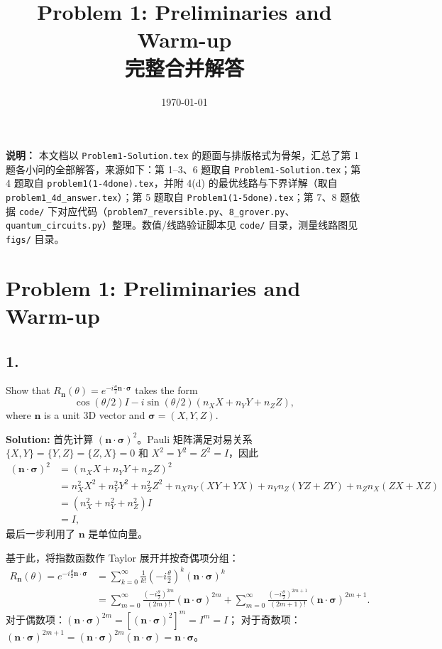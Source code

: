 \documentclass{ctexart}
\title{Problem 1: Preliminaries and Warm-up\\[4pt]\large 完整合并解答}
\author{}
\date{\today}
\begin{document}
\maketitle

\noindent
\textbf{说明：} 本文档以 \texttt{Problem1-Solution.tex} 的题面与排版格式为骨架，汇总了第 1 题各小问的全部解答，来源如下：第 1--3、6 题取自 \texttt{Problem1-Solution.tex}；第 4 题取自 \texttt{problem1(1-4done).tex}，并附 4(d) 的最优线路与下界详解（取自 \texttt{problem1\_4d\_answer.tex}）；第 5 题取自 \texttt{Problem1(1-5done).tex}；第 7、8 题依据 \texttt{code/} 下对应代码（\texttt{problem7\_reversible.py}、\texttt{8\_grover.py}、\texttt{quantum\_circuits.py}）整理。数值/线路验证脚本见 \texttt{code/} 目录，测量线路图见 \texttt{figs/} 目录。

\medskip

\section*{Problem 1: Preliminaries and Warm-up}

\subsection*{1.}
Show that $R_{\mathbf{n}}(\theta) = e^{-i\frac{\theta}{2}\mathbf{n}\cdot\boldsymbol{\sigma}}$ takes the form
\begin{equation}
    \cos(\theta/2)I - i\sin(\theta/2)(n_X X + n_Y Y + n_Z Z),
\end{equation}
where $\mathbf{n}$ is a unit 3D vector and $\boldsymbol{\sigma} = (X, Y, Z)$.

\medskip
\noindent\textbf{Solution:}
首先计算 $(\mathbf{n}\cdot\boldsymbol{\sigma})^2$。Pauli 矩阵满足对易关系
$\{X,Y\} = \{Y,Z\} = \{Z,X\} = 0$ 和 $X^2 = Y^2 = Z^2 = I$，因此
\begin{align*}
    (\mathbf{n}\cdot\boldsymbol{\sigma})^2
    &= (n_X X + n_Y Y + n_Z Z)^2 \\
    &= n_X^2 X^2 + n_Y^2 Y^2 + n_Z^2 Z^2
       + n_X n_Y (XY+YX) + n_Y n_Z (YZ+ZY) + n_Z n_X (ZX+XZ) \\
    &= (n_X^2 + n_Y^2 + n_Z^2) I \\
    &= I,
\end{align*}
最后一步利用了 $\mathbf{n}$ 是单位向量。

基于此，将指数函数作 Taylor 展开并按奇偶项分组：
\begin{align*}
    R_{\mathbf{n}}(\theta) = e^{-i\frac{\theta}{2}\mathbf{n}\cdot\boldsymbol{\sigma}}
    &= \sum_{k=0}^{\infty} \frac{1}{k!} \left(-i\frac{\theta}{2}\right)^k (\mathbf{n}\cdot\boldsymbol{\sigma})^k \\
    &= \sum_{m=0}^{\infty} \frac{(-i\frac{\theta}{2})^{2m}}{(2m)!} (\mathbf{n}\cdot\boldsymbol{\sigma})^{2m}
       + \sum_{m=0}^{\infty} \frac{(-i\frac{\theta}{2})^{2m+1}}{(2m+1)!} (\mathbf{n}\cdot\boldsymbol{\sigma})^{2m+1}.
\end{align*}
对于偶数项：$(\mathbf{n}\cdot\boldsymbol{\sigma})^{2m} = [(\mathbf{n}\cdot\boldsymbol{\sigma})^2]^m = I^m = I$；
对于奇数项：$(\mathbf{n}\cdot\boldsymbol{\sigma})^{2m+1} = (\mathbf{n}\cdot\boldsymbol{\sigma})^{2m}(\mathbf{n}\cdot\boldsymbol{\sigma}) = \mathbf{n}\cdot\boldsymbol{\sigma}$。
\end{document}
